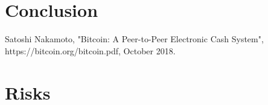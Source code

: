 \documentclass[11pt,a4paper,draft]{article}
\begin{document}
\section{Conclusion}

\newpage
\begin{thebibliography}{9}

Satoshi Nakamoto,
"Bitcoin: A Peer-to-Peer Electronic Cash System",
https://bitcoin.org/bitcoin.pdf,
October 2018.

\end{thebibliography}

\newpage
\appendix

\section{Risks}
\end{document}
